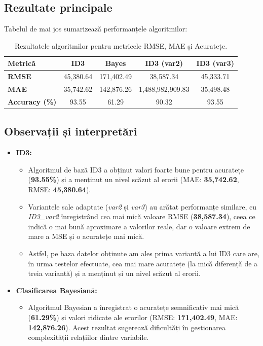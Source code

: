 \documentclass[a4paper,12pt]{article}
\begin{document}
\subsection{Rezultate principale}
Tabelul de mai jos sumarizează performanțele algoritmilor: \\
\begin{table}[!ht]
\centering
\begin{tabular}{|l|c|c|c|c|}
\hline
\textbf{Metrică}       & \textbf{ID3}      & \textbf{Bayes}   & \textbf{ID3 (var2)} & \textbf{ID3 (var3)} \\ \hline
\textbf{RMSE}          & 45,380.64         & 171,402.49       & 38,587.34           & 45,333.71           \\ \hline
\textbf{MAE}           & 35,742.62         & 142,876.26       & 1,488,982,909.83    & 35,498.48           \\ \hline
\textbf{Accuracy (\%)}      & 93.55             & 61.29            & 90.32               
& 93.55                \\ \hline
\end{tabular}
\caption{Rezultatele algoritmilor pentru metricele RMSE, MAE și Acuratețe.}
\label{tab:rezultate_algoritmi}
\end{table}

\subsection{Observații și interpretări}
\begin{itemize}
    \item \textbf{ID3:}
    \begin{itemize}
        \item Algoritmul de bază ID3 a obținut valori foarte bune pentru acuratețe (\textbf{93.55\%}) și a menținut un nivel scăzut al erorii (MAE: \textbf{35,742.62}, RMSE: \textbf{45,380.64}).
        \item Variantele sale adaptate (\textit{var2} și \textit{var3}) au arătat performanțe similare, cu \textit{ID3\_var2} înregistrând cea mai mică valoare RMSE (\textbf{38,587.34}), ceea ce indică o mai bună aproximare a valorilor reale, dar o valoare extrem de mare a MSE și o acuratețe mai mică. 
        \item Astfel, pe baza datelor obținute am ales prima variantă a lui ID3 care are, în urma testelor efectuate, cea mai mare acuratețe (la mică diferență de a treia variantă) și a menținut și un nivel scăzut al erorii.
    \end{itemize}
    \item \textbf{Clasificarea Bayesiană:}
    \begin{itemize}
        \item Algoritmul Bayesian a înregistrat o acuratețe semnificativ mai mică (\textbf{61.29\%}) și valori ridicate ale erorilor (RMSE: \textbf{171,402.49}, MAE: \textbf{142,876.26}). Acest rezultat sugerează dificultăți în gestionarea complexității relațiilor dintre variabile.
    \end{itemize}
\end{itemize}
\end{document}
